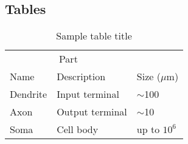 \documentclass{article}
\begin{document}
    \subsection{Tables}

    \begin{table}
        \caption{Sample table title}
        \label{sample-table}
        \centering
        \begin{tabular}{lll}
            \toprule
            \multicolumn{2}{c}{Part}                   \\
            \cmidrule(r){1-2}
            Name     & Description     & Size ($\mu$m) \\
            \midrule
            Dendrite & Input terminal  & $\sim$100     \\
            Axon     & Output terminal & $\sim$10      \\
            Soma     & Cell body       & up to $10^6$  \\
            \bottomrule
        \end{tabular}
    \end{table}

    \printbibliography
\end{document}
